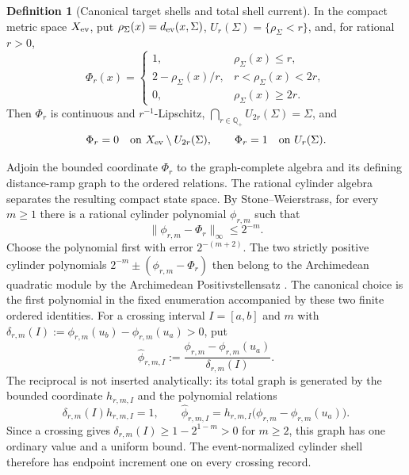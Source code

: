 \documentclass[11pt]{article}
\numberwithin{section}{part}
\theoremstyle{plain}
\theoremstyle{definition}
\newtheorem{definition}[definition]{Definition}
\theoremstyle{remark}
\begin{document}
\begin{definition}[Canonical target shells and total shell current]
\label{def:target-shell-presentation}
In the compact metric space \(X_{\rm ev}\), put
\(\rho_\Sigma(x)=d_{\rm ev}(x,\Sigma)\),
\(U_r(\Sigma)=\{\rho_\Sigma<r\}\), and, for rational \(r>0\),
\begin{equation}
 \label{eq:canonical-target-shell}
 \Phi_r(x)=
 \begin{cases}
  1,&\rho_\Sigma(x)\le r,\\
  2-\rho_\Sigma(x)/r,&r<\rho_\Sigma(x)<2r,\\
  0,&\rho_\Sigma(x)\ge2r.
 \end{cases}
\end{equation}
Then \(\Phi_r\) is continuous and \(r^{-1}\)-Lipschitz,
\(\bigcap_{r\in\mathbb Q_+}U_{2r}(\Sigma)=\Sigma\), and
\begin{equation}
 \label{eq:normalized-target-shell}
 \Phi_r=0\quad\text{on }X_{\rm ev}\setminus U_{2r}(\Sigma),
 \qquad
 \Phi_r=1\quad\text{on }U_r(\Sigma).
\end{equation}

Adjoin the bounded coordinate \(\Phi_r\) to the graph-complete algebra and
its defining distance-ramp graph to the ordered relations.  The rational
cylinder algebra separates the resulting compact state space.  By
Stone--Weierstrass, for every \(m\ge1\) there is a rational cylinder
polynomial \(\phi_{r,m}\) such that
\begin{equation}
 \label{eq:cylinder-shell-approximation}
 \|\phi_{r,m}-\Phi_r\|_\infty\le2^{-m}.
\end{equation}
Choose the polynomial first with error \(2^{-(m+2)}\).  The two strictly
positive cylinder polynomials
\(2^{-m}\pm(\phi_{r,m}-\Phi_r)\) then belong to the Archimedean quadratic
module by the Archimedean Positivstellensatz \citep{Schmudgen2017}.  The
canonical choice is the first polynomial in the fixed enumeration accompanied
by these two finite ordered identities.  For a crossing interval
\(I=[a,b]\) and \(m\) with
\(\delta_{r,m}(I):=\phi_{r,m}(u_b)-\phi_{r,m}(u_a)>0\), put
\[
 \widehat\phi_{r,m,I}
 :=\frac{\phi_{r,m}-\phi_{r,m}(u_a)}{\delta_{r,m}(I)}.
\]
The reciprocal is not inserted analytically: its total graph is generated by
the bounded coordinate \(h_{r,m,I}\) and the polynomial relations
\[
 \delta_{r,m}(I)h_{r,m,I}=1,
 \qquad
 \widehat\phi_{r,m,I}
 =h_{r,m,I}\bigl(\phi_{r,m}-\phi_{r,m}(u_a)\bigr).
\]
Since a crossing gives
\(\delta_{r,m}(I)\ge1-2^{1-m}>0\) for \(m\ge2\), this graph has one ordinary
value and a uniform bound.  The event-normalized cylinder shell therefore has
endpoint increment one on every crossing record.


\end{definition}
\end{document}
